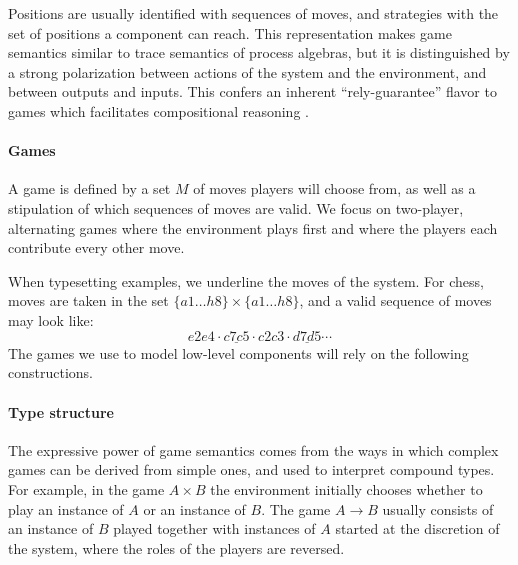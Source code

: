\documentclass[acmsmall,screen,review,anonymous]{acmart}
\newcommand{\kw}[1]{\ensuremath{ \mathsf{#1} }}
\newcommand{\que}{\circ}
\newcommand{\ans}{\bullet}
\begin{document}
Positions are usually identified with sequences of moves,
and strategies with the set of positions
a component can reach.
This representation makes
game semantics similar to
trace semantics of process algebras,
but it is distinguished
by a strong polarization between
actions of the system and the environment,
and between outputs and inputs.
This confers an inherent ``rely-guarantee'' flavor
to games which facilitates compositional reasoning
\cite{cspgs}.


\paragraph{Games} \label{sec:mainideas:gs:games} %

A game is defined by a set $M$ of moves
players will choose from,
as well as a stipulation of which
sequences of moves are valid.
We focus on two-player, alternating games
where the environment plays first and
where the players
each contribute every other move.

When typesetting examples,
we underline the moves of the system.
For chess,
moves are taken in the set $\{a1 \ldots h8\} \times \{a1 \ldots h8\}$,
and a valid sequence of moves may look like:
\[ e2e4 \cdot \underline{c7c5} \cdot c2c3 \cdot \underline{d7d5} \cdots \]
The games we use to model low-level components
will rely on the following constructions.



\paragraph{Type structure} \label{sec:mainideas:gs:types} %

The expressive power of game semantics
comes from the ways in which complex games can be derived from simple ones,
and used to interpret compound types.
For example,
in the game $A \times B$
the environment initially chooses whether to play
an instance of $A$ or an instance of $B$.
The game $A \rightarrow B$ usually consists of
an instance of $B$ played
together with instances of $A$
started at the discretion of the system,
where the roles of the players are reversed.
\end{document}
